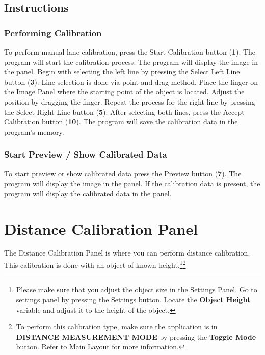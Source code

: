 \subsection{Instructions}

\subsubsection{Performing Calibration}

To perform manual lane calibration, press the Start Calibration button (\textbf{1}). The program will start the calibration process. The program will display the image in the panel. Begin with selecting the left line by pressing the Select Left Line button (\textbf{3}). Line selection is done via point and drag method. Place the finger on the Image Panel where the starting point of the object is located. Adjust the position by dragging the finger. Repeat the process for the right line by pressing the Select Right Line button (\textbf{5}). After selecting both lines, press the Accept Calibration button (\textbf{10}). The program will save the calibration data in the program's memory.

\subsubsection{Start Preview / Show Calibrated Data}

To start preview or show calibrated data press the Preview button (\textbf{7}). The program will display the image in the panel. If the calibration data is present, the program will display the calibrated data in the panel.

\pagebreak
\section{Distance Calibration Panel}
\label{sec:distance-calibration-panel}

The Distance Calibration Panel is where you can perform distance calibration. This calibration is done with an object of known height.\footnote{Please make sure that you adjust the object size in the Settings Panel. Go to settings panel by pressing the Settings button. Locate the \textbf{Object Height} variable and adjust it to the height of the object.}\footnote{To perform this calibration type, make sure the application is in \textbf{DISTANCE MEASUREMENT MODE} by pressing the \textbf{Toggle Mode} button. Refer to \hyperref[sec:main-layout]{Main Layout} for more information.}

